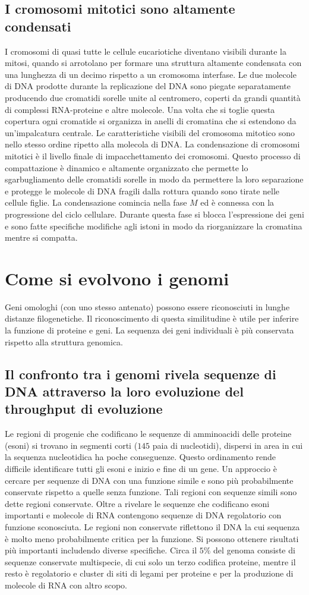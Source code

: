\subsection{I cromosomi mitotici sono altamente condensati}
I cromosomi di quasi tutte le cellule eucariotiche diventano visibili durante la mitosi, quando si arrotolano per formare una struttura altamente condensata con una lunghezza di un
decimo rispetto a un cromosoma interfase. Le due molecole di DNA prodotte durante la replicazione del DNA sono piegate separatamente producendo due cromatidi 
sorelle unite al centromero, coperti da grandi quantit\`a di complessi RNA-proteine e altre molecole. Una volta che si toglie questa copertura ogni cromatide si organizza in anelli di 
cromatina che si estendono da un'impalcatura centrale. Le caratteristiche visibili del cromosoma mitotico sono nello stesso ordine ripetto alla molecola di DNA. La condensazione di 
cromosomi mitotici \`e il livello finale di impacchettamento dei cromosomi. Questo processo di compattazione \`e dinamico e altamente organizzato che permette lo sgarbugliamento delle
cromatidi sorelle in modo da permettere la loro separazione e protegge le molecole di DNA fragili dalla rottura quando sono tirate nelle cellule figlie. La condensazione comincia nella
fase $M$ ed \`e connessa con la progressione del ciclo cellulare. Durante questa fase si blocca l'espressione dei geni e sono fatte specifiche modifiche agli istoni in modo da 
riorganizzare la cromatina mentre si compatta. 
\section{Come si evolvono i genomi}
Geni omologhi (con uno stesso antenato) possono essere riconosciuti in lunghe distanze filogenetiche. Il riconoscimento di questa similitudine \`e utile per inferire la funzione di 
proteine e geni. La sequenza dei geni individuali \`e pi\`u conservata rispetto alla struttura genomica. 
\subsection{Il confronto tra i genomi rivela sequenze di DNA attraverso la loro evoluzione del throughput di evoluzione}
Le regioni di progenie che codificano le sequenze di amminoacidi delle proteine (esoni) si trovano in segmenti corti ($145$ paia di nucleotidi), dispersi in area in cui la sequenza 
nucleotidica ha poche conseguenze. Questo ordinamento rende difficile identificare tutti gli esoni e inizio e fine di un gene. Un approccio \`e cercare per sequenze di DNA con una 
funzione simile e sono pi\`u probabilmente conservate rispetto a quelle senza funzione. Tali regioni con sequenze simili sono dette regioni conservate. Oltre a rivelare le sequenze che
codificano esoni importanti e molecole di RNA contengono sequenze di DNA regolatorio con funzione sconosciuta. Le regioni non conservate riflettono il DNA la cui sequenza \`e molto 
meno probabilmente critica per la funzione. Si possono ottenere risultati pi\`u importanti includendo diverse specifiche. Circa il $5\%$ del genoma consiste di sequenze conservate 
multispecie, di cui solo un terzo codifica proteine, mentre il resto \`e regolatorio e cluster di siti di legami per proteine e per la produzione di molecole di RNA con altro scopo. 
